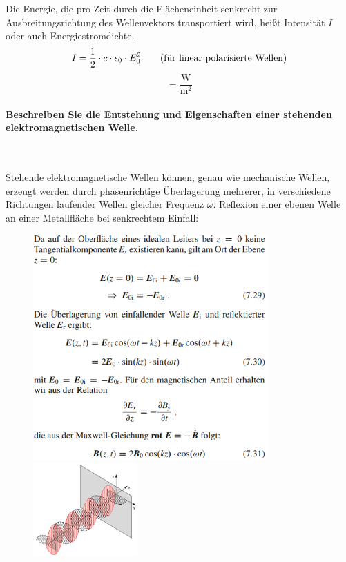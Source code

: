 \documentclass[a4paper, 11pt, ngerman, parskip=half]{scrartcl}
\begin{document}
Die Energie, die pro Zeit durch die Flächeneinheit senkrecht zur Ausbreitungsrichtung des
Wellenvektors transportiert wird, heißt Intensität $I$ oder auch Energiestromdichte.
\begin{equation}
I = \frac{1}{2} \cdot c \cdot \epsilon_0 \cdot E_0^2 \qquad \text{(für linear polarisierte Wellen)} \\
\end{equation}
\begin{equation}
[I] = \frac{\text{W}}{\text{m}^2}
\end{equation}

\newpage

\paragraph{Beschreiben Sie die Entstehung und Eigenschaften einer stehenden elektromagnetischen
Welle.} ~

Stehende elektromagnetische Wellen können, genau wie mechanische Wellen, erzeugt werden durch
phasenrichtige Überlagerung mehrerer, in verschiedene Richtungen laufender Wellen gleicher Frequenz
$\omega$.
Reflexion einer ebenen Welle an einer Metallfläche bei senkrechtem Einfall:
\begin{figure}[H]
    \centering
    \begin{minipage}[b]{0.3\textwidth}
        \centering
        \includegraphics[width=9cm]{image/13/5.png}
    \end{minipage}
    \hspace{5cm}
    \begin{minipage}[b]{0.3\textwidth}
        \centering
        \includegraphics[width=4cm]{image/13/6.png}
    \end{minipage}
\end{figure}
\end{document}
